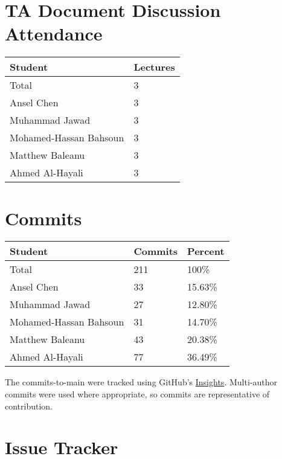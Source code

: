 \documentclass{article}
\begin{document}
\section{TA Document Discussion Attendance}



\begin{table}[H]
\centering
\begin{tabular}{ll}
\toprule
\textbf{Student} & \textbf{Lectures}\\
\midrule
Total & 3\\
Ansel Chen & 3\\
Muhammad Jawad & 3\\
Mohamed-Hassan Bahsoun & 3\\
Matthew Baleanu & 3\\
Ahmed Al-Hayali & 3\\
\bottomrule
\end{tabular}
\end{table}



\section{Commits}

\begin{table}[H]
\centering
\begin{tabular}{lll}
\toprule
\textbf{Student} & \textbf{Commits} & \textbf{Percent}\\
\midrule
Total & 211 & 100\% \\
Ansel Chen & 33 & 15.63\% \\
Muhammad Jawad & 27 & 12.80\% \\
Mohamed-Hassan Bahsoun & 31 & 14.70\% \\
Matthew Baleanu & 43 & 20.38\% \\
Ahmed Al-Hayali & 77 & 36.49\% \\
\bottomrule
\end{tabular}
\end{table}

The commits-to-main were tracked using GitHub's \href{https://github.com/AhmedAl-Hayali/GenreGuru/graphs/contributors}{Insights}. Multi-author commits were used where appropriate, so commits are representative of contribution.

\section{Issue Tracker}
\end{document}
